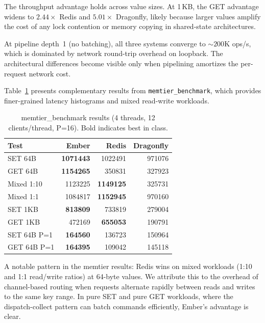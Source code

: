 \documentclass[conference]{IEEEtran}
\begin{document}
The throughput advantage holds across value sizes. At 1\,KB, the GET
advantage widens to $2.44\times$ Redis and $5.01\times$ Dragonfly,
likely because larger values amplify the cost of any lock contention
or memory copying in shared-state architectures.

At pipeline depth~1 (no batching), all three systems converge to
${\sim}200$K ops/s, which is dominated by network round-trip overhead
on loopback. The architectural differences become visible only when
pipelining amortizes the per-request network cost.


Table~\ref{tab:memtier} presents complementary results from
\texttt{memtier\_benchmark}, which provides finer-grained latency
histograms and mixed read-write workloads.

\begin{table}[t]
\centering
\caption{memtier\_benchmark results (4 threads, 12 clients/thread,
P=16). Bold indicates best in class.}
\label{tab:memtier}
\small
\begin{tabular}{@{}lrrr@{}}
\toprule
\textbf{Test} & \textbf{Ember} & \textbf{Redis} & \textbf{Dragonfly} \\
\midrule
SET 64B      & \textbf{\num{1071443}} & \num{1022491} & \num{971076} \\
GET 64B      & \textbf{\num{1154265}} & \num{350831}  & \num{327923} \\
Mixed 1:10   & \num{1123225}          & \textbf{\num{1149125}} & \num{325731} \\
Mixed 1:1    & \num{1084817}          & \textbf{\num{1152945}} & \num{970160} \\
SET 1KB      & \textbf{\num{813809}}  & \num{733819}  & \num{279004} \\
GET 1KB      & \num{472169}           & \textbf{\num{655053}} & \num{190791} \\
SET 64B P=1  & \textbf{\num{164560}}  & \num{136723}  & \num{150964} \\
GET 64B P=1  & \textbf{\num{164395}}  & \num{109042}  & \num{145118} \\
\bottomrule
\end{tabular}
\end{table}

A notable pattern in the memtier results: Redis wins on mixed
workloads (1:10 and 1:1 read/write ratios) at 64-byte values.
We attribute this to the overhead of channel-based routing when
requests alternate rapidly between reads and writes to the same key
range. In pure SET and pure GET workloads, where the dispatch-collect
pattern can batch commands efficiently, Ember's advantage is clear.
\end{document}
